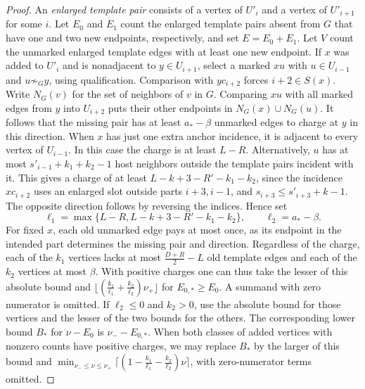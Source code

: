 \documentclass[preprint,11pt,numbers]{elsarticle-arxiv}
\numberwithin{equation}{section}
\theoremstyle{definition}
\begin{document}
\begin{proof}
An \emph{enlarged template pair} consists of a vertex of $U'_i$
and a vertex of $U'_{i+1}$ for some $i$. Let $E_0$ and $E_1$
count the enlarged template pairs absent
from $G$ that have one and two new endpoints, respectively, and set
$E=E_0+E_1$. Let $V$ count the unmarked enlarged template edges with
at least one new endpoint. If $x$ was added to $U'_i$ and is nonadjacent to
$y\in U_{i+1}$, select a marked $xu$ with $u\in U_{i-1}$ and
$u\not\sim_G y$, using qualification. Comparison with $yc_{i+2}$
forces $i+2\in S(x)$. Write $N_G(v)$ for the set of neighbors of
$v$ in $G$. Comparing $xu$ with all marked edges from $y$ into
$U_{i+2}$ puts their other endpoints in $N_G(x)\cup N_G(u)$.
It follows that the missing pair has at least $a_*-\beta$ unmarked edges
to charge at $y$ in this direction. When $x$ has just one extra anchor
incidence, it is adjacent to every vertex of $U_{i-1}$. In this case the charge
is at least $L-R$. Alternatively, $u$ has at most
$s'_{i-1}+k_1+k_2-1$ host neighbors outside the template pairs
incident with it. This gives a charge of at least
$L-k+3-R'-k_1-k_2$, since the incidence $xc_{i+2}$ uses an enlarged
slot outside parts $i+3,i-1$, and $s_{i+3}\leq s'_{i+3}+k-1$.
The opposite direction follows by reversing the indices. Hence set
\[
 \ell_1=\max\{L-R,L-k+3-R'-k_1-k_2\},\qquad \ell_2=a_*-\beta.
\]
For fixed $x$, each old unmarked edge pays at most once, as its endpoint
in the intended part determines the missing pair and direction.
Regardless of the charge, each of the $k_1$ vertices lacks at most
$\frac{D+R}{2}-L$ old template edges and each of the $k_2$ vertices at
most $\beta$. With positive charges one can thus take the lesser of this
absolute bound and $\lfloor(\frac{k_1}{\ell_1}+\frac{k_2}{\ell_2})\nu_+\rfloor$ for
$E_{0,*}\geq E_0$. A summand with zero numerator is omitted. If
$\ell_2\leq0$ and $k_2>0$, use the absolute bound for those vertices and
the lesser of the two bounds for the others. The corresponding lower
bound $B_*$ for $\nu-E_0$ is $\nu_--E_{0,*}$. When both classes of added
vertices with nonzero counts have positive charges, we may replace
$B_*$ by the larger of this bound and
$\min_{\nu_-\leq \nu\leq \nu_+}\bigl\lceil
(1-\frac{k_1}{\ell_1}-\frac{k_2}{\ell_2})\nu\bigr\rceil$,
with zero-numerator terms omitted.


\end{proof}
\end{document}
